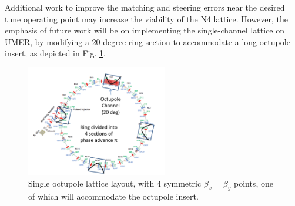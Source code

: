Additional work to improve the matching and steering errors near the desired tune operating point may increase the viability of the N4 lattice. However, the emphasis of future work will be on implementing the single-channel lattice on UMER, by modifying a 20 degree ring section to accommodate a long octupole insert, as depicted in Fig. \ref{SClattice}.

\begin{figure}[!tb]
   \centering
   \includegraphics*[width=174pt]{6.figures/SC_lattice}
   \caption{Single octupole lattice layout, with 4 symmetric $\beta_x = \beta_y$ points, one of which will accommodate the octupole insert.}
   \label{SClattice}
\end{figure}

